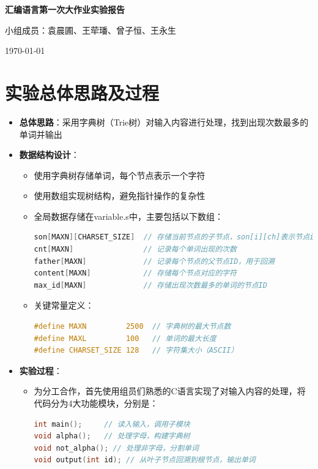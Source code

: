 \documentclass[10pt,a4paper]{article}
\begin{document}
\begin{center}
    \LARGE{\textbf{汇编语言第一次大作业实验报告}}
    
    \vspace{0.5cm}
    \large{小组成员：袁晨圃、王荦璠、曾子恒、王永生}
    
    \vspace{0.3cm}
    \today
\end{center}

\section{实验总体思路及过程}

\begin{itemize}
    \item \textbf{总体思路}：采用字典树（Trie树）对输入内容进行处理，找到出现次数最多的单词并输出
    \item \textbf{数据结构设计}：
    \begin{itemize}
        \item 使用字典树存储单词，每个节点表示一个字符
        \item 使用数组实现树结构，避免指针操作的复杂性
        \item 全局数据存储在variable.s中，主要包括以下数组：
        \begin{lstlisting}[language=C]
son[MAXN][CHARSET_SIZE]  // 存储当前节点的子节点，son[i][ch]表示节点i的字符ch子节点的ID
cnt[MAXN]                // 记录每个单词出现的次数
father[MAXN]             // 记录每个节点的父节点ID，用于回溯
content[MAXN]            // 存储每个节点对应的字符
max_id[MAXN]             // 存储出现次数最多的单词的节点ID
        \end{lstlisting}
        
        \item 关键常量定义：
        \begin{lstlisting}[language=C]
#define MAXN         2500  // 字典树的最大节点数
#define MAXL         100   // 单词的最大长度
#define CHARSET_SIZE 128   // 字符集大小（ASCII）
        \end{lstlisting}
    \end{itemize}
    \item \textbf{实验过程}：
    \begin{itemize}
        \item 为分工合作，首先使用组员们熟悉的C语言实现了对输入内容的处理，将代码分为4大功能模块，分别是：
        
        \begin{lstlisting}[language=C]
int main();     // 读入输入，调用子模块
void alpha();   // 处理字母，构建字典树
void not_alpha(); // 处理非字母，分割单词
void output(int id); // 从叶子节点回溯到根节点，输出单词
        \end{lstlisting}
        

\end{itemize}
\end{itemize}
\end{document}
